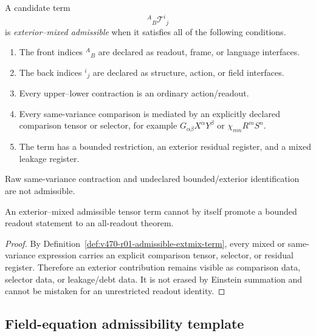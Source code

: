 \begin{definition}
\label{def:v470-r01-admissible-extmix-term}
A candidate term
\[
{}^{A}{}_{B}\mathcal T^{i}{}_{j}
\]
is \emph{exterior--mixed admissible} when it satisfies all of the following
conditions.
\begin{enumerate}[label=(\alph*)]
    \item The front indices \({}^{A}{}_{B}\) are declared as readout, frame, or
    language interfaces.
    \item The back indices \({}^{i}{}_{j}\) are declared as structure, action,
    or field interfaces.
    \item Every upper--lower contraction is an ordinary action/readout.
    \item Every same-variance comparison is mediated by an explicitly declared
    comparison tensor or selector, for example
    \(G_{\alpha\beta}X^{\alpha}Y^{\beta}\) or
    \(\chi_{mn}R^mS^n\).
    \item The term has a bounded restriction, an exterior residual register, and
    a mixed leakage register.
\end{enumerate}
Raw same-variance contraction and undeclared bounded/exterior identification are
not admissible.
\end{definition}

\begin{lemma}
\label{lem:v470-r01-sidedness-prevents-silent-promotion}
An exterior--mixed admissible tensor term cannot by itself promote a bounded
readout statement to an all-readout theorem.
\end{lemma}

\begin{proof}
By Definition~\ref{def:v470-r01-admissible-extmix-term}, every mixed or
same-variance expression carries an explicit comparison tensor, selector, or
residual register.  Therefore an exterior contribution remains visible as
comparison data, selector data, or leakage/debt data.  It is not erased by
Einstein summation and cannot be mistaken for an unrestricted readout identity.
\end{proof}

\subsection{Field-equation admissibility template}
\label{subsec:v470-r01-field-equation-admissibility-template}

